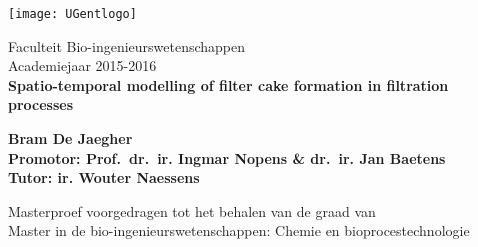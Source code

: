 \begin{titlepage}

\noindent
\vspace{-3cm}

\selectfont
\sffamily


\begin{center}

\texttt{[image: UGentlogo]}
\vspace{0.75cm}

\LARGE Faculteit Bio-ingenieurswetenschappen\\
\vspace{0.25cm}
Academiejaar 2015-2016\\
\vspace{4.5cm}
\huge \textbf{Spatio-temporal modelling of filter cake formation in filtration processes}
\vspace{3.5cm}
\end{center}
\bfseries
\large Bram De Jaegher\\
\mdseries
Promotor: Prof.~dr.~ir. Ingmar Nopens \& dr.~ir. Jan Baetens\\
Tutor: ir. Wouter Naessens\\ 
\vspace{2.5cm}
\begin{center}
Masterproef voorgedragen tot het behalen van de graad van\\
Master in de bio-ingenieurswetenschappen: Chemie en bioprocestechnologie
\vspace{0.75cm}
\end{center}
\thispagestyle{empty}

\end{titlepage}
